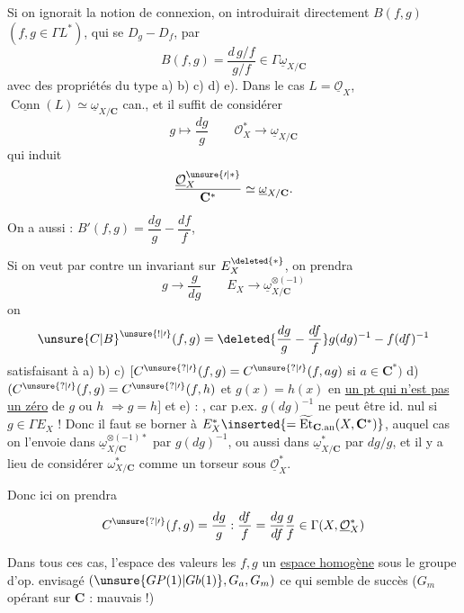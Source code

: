 Si on ignorait la notion de connexion, on introduirait directement
$B(f,g)$ $(f,g\in\Gamma L^*)$, qui se  $D_g-D_f$, par
\[
B(f,g)=\frac{d\,g/f}{g/f}\in\Gamma\underline\omega_{X/\mathbf C}
\]
avec des propriétés du type a) b) c) d) e). Dans le cas
$L=\underline{\mathcal O}_X$,
$\underline{\operatorname{Conn}}(L)\simeq\underline\omega_{X/\mathbf C}$
can., et il suffit de considérer
\[
g\longmapsto\frac{dg}{g}\qquad
\mathcal O_X^*\longrightarrow\underline\omega_{X/\mathbf C}
\]
qui induit
\[
\frac{\underline{\mathcal O}_X^{\unsure{\prime|*}}}{\mathbf C^*}
\simeq\underline\omega_{X/\mathbf C}.
\]

On a aussi : $B'(f,g)=\dfrac{dg}{g}-\dfrac{df}{f}$, \unsure{\ldots}

Si on veut par contre un invariant sur $E_X^{\deleted{*}}$, on prendra
\[
g\longrightarrow\frac{g}{dg}\qquad
E_X\longrightarrow\underline\omega_{X/\mathbf C}^{\otimes(-1)}
\]
on  
\[
\unsure{C|B}^{\unsure{!|\prime}}(f,g)=
\deleted{\frac{dg}{g}-\frac{df}{f}}
g(dg)^{-1}-f(df)^{-1}
\]
satisfaisant à a) b) c)
$[C^{\unsure{?|\prime}}(f,g)=C^{\unsure{?|\prime}}(f,ag)$
si $a\in\mathbf C^*)$
d) $(C^{\unsure{?|\prime}}(f,g)=C^{\unsure{?|\prime}}(f,h)$ et
$g(x)=h(x)$ en \uline{un pt qui n'est pas un zéro} de $g$ ou $h$
$\Longrightarrow g=h]$ et e) 
 : , car
p.ex. $g(dg)^{-1}$ ne peut être id. nul si $g\in\Gamma E_X$ !
Donc il faut se borner à
$E_X^*\inserted{=\widetilde{\operatorname{Et}}_{\mathbf C.\mathrm{an}}
(X,\mathbf C^*)}$, auquel cas on l'envoie dans
$\underline\omega_{X/\mathbf C}^{\otimes(-1)*}$ par $g(dg)^{-1}$,
ou aussi dans $\underline\omega_{X/\mathbf C}^*$ par $dg/g$,
et il y a lieu de considérer $\omega_{X/\mathbf C}^*$ comme un torseur
sous $\underline{\mathcal O}_X^*$.

Donc ici on prendra
\[
C^{\unsure{?|\prime}}(f,g)=\frac{dg}{g}:\frac{df}{f}
=\frac{dg}{df}\frac{g}{f}\in\Gamma(X,\underline{\mathcal O}_X^*)
\]

Dans tous ces cas, l'espace des valeurs  les $f,g$
 un \uline{espace homogène} sous le groupe d'op.
envisagé $(\unsure{GP(1)|Gb(1)},G_a,G_m)$ ce qui semble
 de succès ($G_m$ opérant sur $\mathbf C$ : mauvais !)

